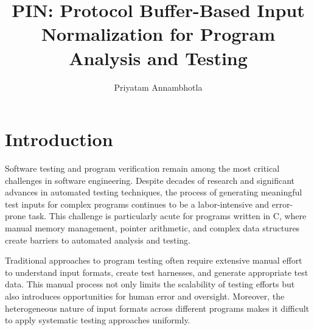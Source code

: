 \documentclass[doublespace,nopageskip]{VTthesis} %
\title{PIN: Protocol Buffer-Based Input Normalization for Program Analysis and Testing}
\author{Priyatam Annambhotla}
\begin{document}
  \frontmatter
  \maketitle
  \tableofcontents

	\listoffigures
	\listoftables
    \printnomenclature %


	\mainmatter

	\chapter{Introduction} \label{ch:introduction}
	
		Software testing and program verification remain among the most critical challenges in software engineering. Despite decades of research and significant advances in automated testing techniques, the process of generating meaningful test inputs for complex programs continues to be a labor-intensive and error-prone task. This challenge is particularly acute for programs written in C, where manual memory management, pointer arithmetic, and complex data structures create barriers to automated analysis and testing.
		
		Traditional approaches to program testing often require extensive manual effort to understand input formats, create test harnesses, and generate appropriate test data. This manual process not only limits the scalability of testing efforts but also introduces opportunities for human error and oversight. Moreover, the heterogeneous nature of input formats across different programs makes it difficult to apply systematic testing approaches uniformly.
		
\end{document}
